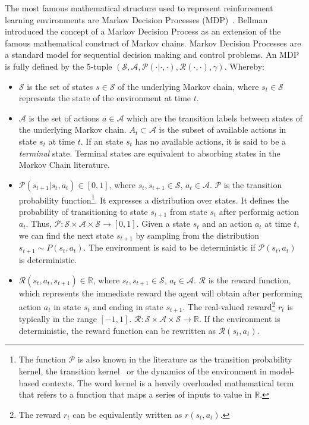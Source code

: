 \documentclass{../main.tex}{}
\begin{document}
The most famous mathematical structure used to represent reinforcement learning environments are Markov Decision Processes (MDP)~\citep{Bellman1957}. Bellman introduced the concept of a Markov Decision Process as an extension of the famous mathematical construct of Markov chains. Markov Decision Processes are a standard model for sequential decision making and control problems. An MDP is fully defined by the 5-tuple $(\mathcal{S}, \mathcal{A}, \mathcal{P(\cdot | \cdot, \cdot)}, \mathcal{R}(\cdot, \cdot), \gamma)$. Whereby:

\begin{itemize}
\item $\mathcal{S}$ is the set of states $s \in \mathcal{S}$ of the underlying Markov chain, where $s_t \in \mathcal{S}$ represents the state of the environment at time $t$.
\item $\mathcal{A}$ is the set of actions $a \in \mathcal{A}$ which are the transition labels between states of the underlying Markov chain. $A_t \subset \mathcal{A}$ is the subset of available actions in state $s_t$ at time $t$. If an state $s_t$ has no available actions, it is said to be a \textit{terminal} state. Terminal states are equivalent to absorbing states in the Markov Chain literature.
\item $\mathcal{P}(s_{t+1} | s_t, a_t) \in [0, 1]$, where $s_t, s_{t+1} \in \mathcal{S}$, $a_t \in \mathcal{A}$. $\mathcal{P}$ is the transition probability function\footnote{The function $\mathcal{P}$ is also known in the literature as the transition probability kernel, the transition kernel~\citep{Tamar2017} or the dynamics of the environment in model-based contexts. The word kernel is a heavily overloaded mathematical term that refers to a function that maps a series of inputs to value in $\mathbb{R}$.}. It expresses a distribution over states. It defines the probability of transitioning to state $s_{t+1}$ from state $s_t$ after performig action $a_t$. Thus, $\mathcal{P}: \mathcal{S} \times \mathcal{A} \times \mathcal{S} \to [0,1]$. Given a state $s_t$ and an action $a_t$ at time $t$, we can find the next state $s_{t+1}$ by sampling from the distribution $s_{t+1} \sim P(s_t, a_t)$. The environment is said to be deterministic if $\mathcal{P}(s_t, a_t)$ is deterministic.%
\item $\mathcal{R}(s_t, a_t, s_{t+1}) \in \mathbb{R}$, where $s_t, s_{t+1} \in \mathcal{S}$, $a_t \in \mathcal{A}$. $\mathcal{R}$ is the reward function, which represents the immediate reward the agent will obtain after performing action $a_t$ in state $s_t$ and ending in state $s_{t+1}$. The real-valued reward\footnote{The reward $r_t$ can be equivalently written as $r(s_t, a_t)$.} $r_t$ is typically in the range $[-1,1]$. $\mathcal{R}: \mathcal{S} \times \mathcal{A} \times \mathcal{S} \to \mathbb{R}$. If the environment is deterministic, the reward function can be rewritten as $\mathcal{R}(s_t, a_t)$.

\end{itemize}
\end{document}
